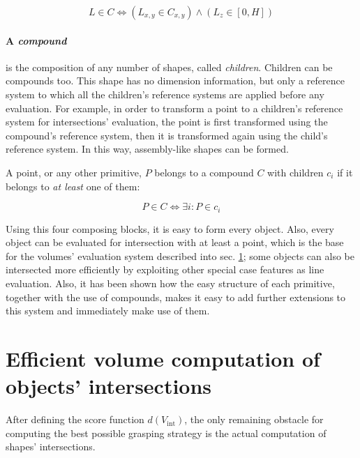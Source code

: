 \begin{equation}
  L \in C \Leftrightarrow
  \left(L_{x,y} \in C_{x,y} \right)
  \wedge
  \left(L_{z} \in [0,H] \right)
\end{equation}

\paragraph{A \emph{compound}} is the composition of any number of shapes, called
\emph{children}. Children can be compounds too. This shape has no dimension
information, but only a reference system to which all the children's reference
systems are applied before any evaluation. For example, in order to transform a
point to a children's reference system for intersections' evaluation, the point
is first transformed using the compound's reference system, then it is
transformed again using the child's reference system. In this way, assembly-like
shapes can be formed.

A point, or any other primitive, $P$ belongs to a compound $C$ with children $c_i$ if it belongs to
\emph{at least} one of them:

\begin{equation}
  P \in C \Leftrightarrow \exists i : P \in c_i
\end{equation}

Using this four composing blocks, it is easy to form every object. Also, every
object can be evaluated for intersection with at least a point, which is the
base for the volumes' evaluation system described into sec.
\ref{sec:grasp_computing}; some objects can also be intersected more efficiently by
exploiting other special case features as line evaluation. Also, it has been
shown how the easy structure of each primitive, together with the use of
compounds, makes it easy to add further extensions to this system and immediately
make use of them.

\section{Efficient volume computation of objects' intersections} \label{sec:grasp_computing}
After defining the score function $d(V_{\text{int}})$, the only remaining
obstacle for computing the best possible grasping strategy is the actual
computation of shapes' intersections. 
